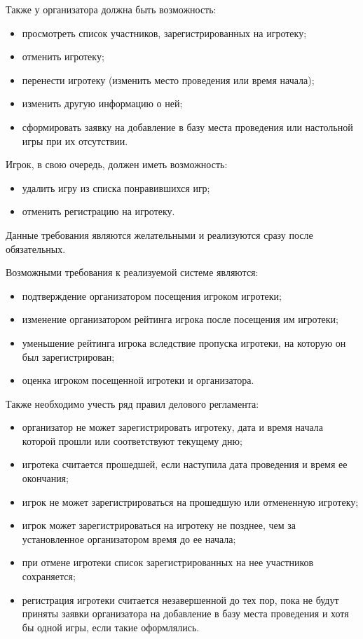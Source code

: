 Также у организатора должна быть возможность:
\begin{itemize}
    \item просмотреть список участников, зарегистрированных на игротеку;
    \item отменить игротеку;
    \item перенести игротеку (изменить место проведения или время начала);
    \item изменить другую информацию о ней;
    \item сформировать заявку на добавление в базу места проведения или
        настольной игры при их отсутствии.
\end{itemize}

Игрок, в свою очередь, должен иметь возможность:
\begin{itemize}
    \item удалить игру из списка понравившихся игр;
    \item отменить регистрацию на игротеку.
\end{itemize}

Данные требования являются желательными и реализуются сразу после обязательных.
 
Возможными требования к реализуемой системе являются:
\begin{itemize}
    \item подтверждение организатором посещения игроком игротеки;
    \item изменение организатором рейтинга игрока после посещения им игротеки;
    \item уменьшение рейтинга игрока вследствие пропуска игротеки, на которую он
        был зарегистрирован;
    \item оценка игроком посещенной игротеки и организатора.
\end{itemize}

Также необходимо учесть ряд правил делового регламента:
\begin{itemize}
    \item организатор не может зарегистрировать игротеку, дата и время начала
        которой прошли или соответствуют текущему дню;
    \item игротека считается прошедшей, если наступила дата проведения и время
        ее окончания;
    \item игрок не может зарегистрироваться на прошедшую или отмененную
        игротеку;
    \item игрок может зарегистрироваться на игротеку не позднее, чем за
        установленное организатором время до ее начала;
    \item при отмене игротеки список зарегистрированных на нее участников
        сохраняется;
    \item регистрация игротеки считается незавершенной до тех пор, пока не будут
        приняты заявки организатора на добавление в базу места проведения и хотя
        бы одной игры, если такие оформлялись.
\end{itemize}

